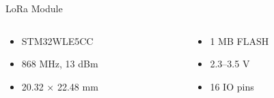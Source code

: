 \documentclass{beamer}
\begin{document}
\begin{frame}{LoRa Module}
\begin{figure}
    \centering
    \small
    
\end{figure}
\begin{columns}[T]
\begin{column}{.5\textwidth}
    \begin{itemize}
        \item STM32WLE5CC
        \item 868 MHz, 13 dBm
        \item 20.32 $\times$ 22.48 mm
    \end{itemize}
\end{column}
\hfill
\begin{column}{.5\textwidth}
    \begin{itemize}
        \item 1 MB FLASH
        \item 2.3--3.5 V
        \item 16 IO pins
    \end{itemize}
\end{column}
\end{columns}
\end{frame}
\end{document}
